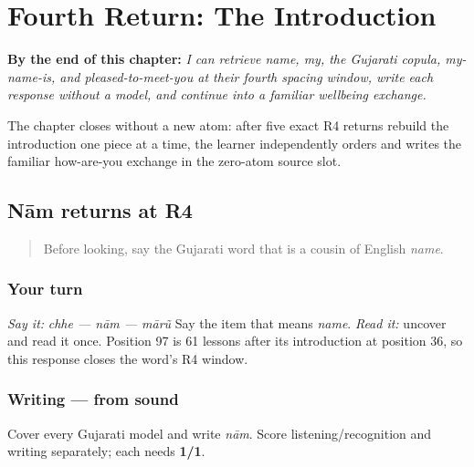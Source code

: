 
\chapter{Fourth Return: The Introduction}
\label{ch:gu-r4-introduction}

\begin{chapteropening}
\textbf{By the end of this chapter:} \emph{I can retrieve name, my, the Gujarati copula, my-name-is, and pleased-to-meet-you at their fourth spacing window, write each response without a model, and continue into a familiar wellbeing exchange.}

The chapter closes without a new atom: after five exact R4 returns rebuild the introduction one piece at a time, the learner independently orders and writes the familiar how-are-you exchange in the zero-atom source slot.
\end{chapteropening}

\section[Practice]{Nām returns at R4}

\label{lesson:GU-R16-naam-r4}



\begin{quote}
Before looking, say the Gujarati word that is a cousin of English \emph{name}.
\end{quote}

\subsection*{Your turn}
\emph{Say it:} \emph{chhe — nām — mārũ} Say the item that means \emph{name}. \emph{Read it:} uncover \textbf{} and read it once. Position 97 is 61 lessons after its introduction at position 36, so this response closes the word's R4 window.

\subsection*{Writing — from sound}
Cover every Gujarati model and write \emph{nām}. Score listening/recognition and writing separately; each needs \textbf{1/1}.

